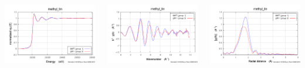 \documentclass[10pt, xcolor=x11names, compress, handout]{beamer}
\begin{document}
\begin{frame}
\begin{columns}
\begin{column}{0.33\linewidth}
      \includegraphics[width=\linewidth]{../noxtal/images/mtin_mu.png}
    \end{column}
    \begin{column}{0.33\linewidth}
      \includegraphics[width=\linewidth]{../noxtal/images/mtin_chik.png}
    \end{column}
    \begin{column}{0.33\linewidth}
      \includegraphics[width=\linewidth]{../noxtal/images/mtin_chir.png}
    \end{column}
  \end{columns}
\end{frame}
\end{document}
